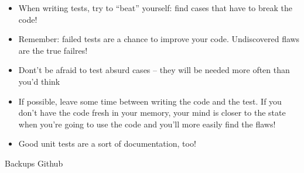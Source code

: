 
\begin{frame}
%
\begin{hintbox}
\begin{itemize}
\item When writing tests, try to \enquote{beat} yourself: find cases that have to break the code!
\item Remember: failed tests are a chance to improve your code. Undiscovered flaws are the true failres!
\item Dont't be afraid to test absurd cases -- they will be needed more often than you'd think
\item If possible, leave some time between writing the code and the test.
	If you don't have the code fresh in your memory, your mind is closer to the state when you're going to use the code and you'll more easily find the flaws!
\item Good unit tests are a sort of documentation, too!
\end{itemize}
\end{hintbox}
%
\end{frame}


\begin{frame}{Backups}
%
Github
%
\end{frame}